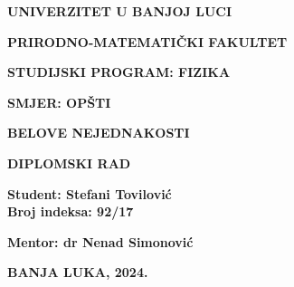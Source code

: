 \begin{titlepage}
    \begin{minipage}[t][0.33\textheight][t]{\textwidth}
        \centering
        {\textbf{UNIVERZITET U BANJOJ LUCI} \par}
        {\textbf{PRIRODNO-MATEMATIČKI FAKULTET} \par}
        {\textbf{STUDIJSKI PROGRAM: FIZIKA} \par}
        {\textbf{SMJER: OPŠTI} \par}
      \end{minipage}
      
      \vfill %
      
      \begin{minipage}[t][0.33\textheight][c]{\textwidth}
        \centering

        {\large \textbf{BELOVE NEJEDNAKOSTI}}
    
    \vspace{1cm}

        
        { \textbf{DIPLOMSKI RAD} \par}
      \end{minipage}
      
      \vfill %
      
      \begin{minipage}[t][0.33\textheight][b]{\textwidth}
        \centering
        \begin{multicols}{2}
          \raggedright
          {\textbf{Student: Stefani Tovilović}}\\
          {\textbf{Broj indeksa: 92/17}}
          
          \raggedleft
          {\textbf{Mentor: dr Nenad Simonović}}
        \end{multicols}
        {\large \textbf{BANJA LUKA, 2024.} \par}
      \end{minipage}

\end{titlepage}